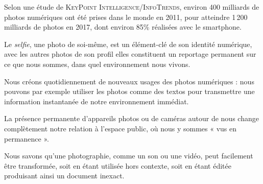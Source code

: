 \begin{jazzitemize}
\item Selon une étude de \textsc{KeyPoint Intelligence}/\textsc{InfoTrends}, environ 400 milliards de photos numériques ont été prises dans le monde en 2011, pour atteindre 1\,200 milliards de photos en 2017, dont environ 85\% réalisées avec le smartphone.
\item Le \textit{selfie}, une photo de soi-même, est un élément-clé de son identité numérique, avec les autres photos de son profil elles constituent un reportage permanent sur ce que nous sommes, dans quel environnement nous vivons.
\item Nous créons quotidiennement de nouveaux usages des photos numériques : nous pouvons par exemple utiliser les photos comme des textos pour transmettre une information instantanée de notre environnement immédiat.
\item La présence permanente d'appareils photos ou de caméras autour de nous change complètement notre relation à l'espace public, où nous y sommes « vus en permanence ».
\item Nous savons qu'une photographie, comme un son ou une vidéo, peut facilement être transformée, soit en étant utilisée hors contexte, soit en étant éditée produisant ainsi un document inexact.
\end{jazzitemize}


